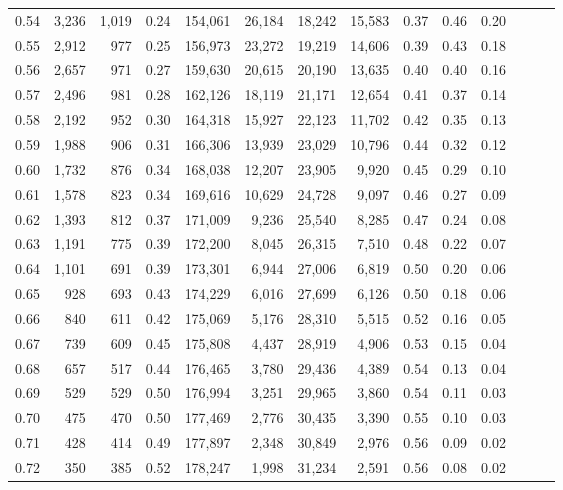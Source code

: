 \begin{tabular}{rrrrrrrrrrrrrr}
0.54 &  3,236 &  1,019 &  0.24 &  154,061 &   26,184 &  18,242 &  15,583 &  0.37 &  0.46 &      0.20 \\
0.55 &  2,912 &    977 &  0.25 &  156,973 &   23,272 &  19,219 &  14,606 &  0.39 &  0.43 &      0.18 \\
0.56 &  2,657 &    971 &  0.27 &  159,630 &   20,615 &  20,190 &  13,635 &  0.40 &  0.40 &      0.16 \\
0.57 &  2,496 &    981 &  0.28 &  162,126 &   18,119 &  21,171 &  12,654 &  0.41 &  0.37 &      0.14 \\
0.58 &  2,192 &    952 &  0.30 &  164,318 &   15,927 &  22,123 &  11,702 &  0.42 &  0.35 &      0.13 \\
0.59 &  1,988 &    906 &  0.31 &  166,306 &   13,939 &  23,029 &  10,796 &  0.44 &  0.32 &      0.12 \\
0.60 &  1,732 &    876 &  0.34 &  168,038 &   12,207 &  23,905 &   9,920 &  0.45 &  0.29 &      0.10 \\
0.61 &  1,578 &    823 &  0.34 &  169,616 &   10,629 &  24,728 &   9,097 &  0.46 &  0.27 &      0.09 \\
0.62 &  1,393 &    812 &  0.37 &  171,009 &    9,236 &  25,540 &   8,285 &  0.47 &  0.24 &      0.08 \\
0.63 &  1,191 &    775 &  0.39 &  172,200 &    8,045 &  26,315 &   7,510 &  0.48 &  0.22 &      0.07 \\
0.64 &  1,101 &    691 &  0.39 &  173,301 &    6,944 &  27,006 &   6,819 &  0.50 &  0.20 &      0.06 \\
0.65 &    928 &    693 &  0.43 &  174,229 &    6,016 &  27,699 &   6,126 &  0.50 &  0.18 &      0.06 \\
0.66 &    840 &    611 &  0.42 &  175,069 &    5,176 &  28,310 &   5,515 &  0.52 &  0.16 &      0.05 \\
0.67 &    739 &    609 &  0.45 &  175,808 &    4,437 &  28,919 &   4,906 &  0.53 &  0.15 &      0.04 \\
0.68 &    657 &    517 &  0.44 &  176,465 &    3,780 &  29,436 &   4,389 &  0.54 &  0.13 &      0.04 \\
0.69 &    529 &    529 &  0.50 &  176,994 &    3,251 &  29,965 &   3,860 &  0.54 &  0.11 &      0.03 \\
0.70 &    475 &    470 &  0.50 &  177,469 &    2,776 &  30,435 &   3,390 &  0.55 &  0.10 &      0.03 \\
0.71 &    428 &    414 &  0.49 &  177,897 &    2,348 &  30,849 &   2,976 &  0.56 &  0.09 &      0.02 \\
0.72 &    350 &    385 &  0.52 &  178,247 &    1,998 &  31,234 &   2,591 &  0.56 &  0.08 &      0.02 \\

\end{tabular}

